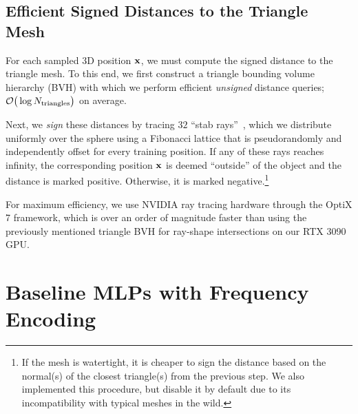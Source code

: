\documentclass[acmtog,authorversion]{acmart}
\begin{document}
\subsection{Efficient Signed Distances to the Triangle Mesh}
For each sampled 3D position $\mathbf{x}$, we must compute the signed distance to the triangle mesh.
To this end, we first construct a triangle bounding volume hierarchy (BVH) with which we perform efficient \emph{unsigned} distance queries; $\mathcal{O}\big(\log{N_\mathrm{triangles}}\big)$ on average.

Next, we \emph{sign} these distances by tracing $32$ ``stab rays''~\citep{nooruddin2003simplification}, which we distribute uniformly over the sphere using a Fibonacci lattice that is pseudorandomly and independently offset for every training position.
If any of these rays reaches infinity, the corresponding position $\mathbf{x}$ is deemed ``outside'' of the object and the distance is marked positive.
Otherwise, it is marked negative.\footnote{If the mesh is watertight, it is cheaper to sign the distance based on the normal(s) of the closest triangle(s) from the previous step. We also implemented this procedure, but disable it by default due to its incompatibility with typical meshes in the wild.}

For maximum efficiency, we use NVIDIA ray tracing hardware through the OptiX \num{7} framework, which is over an order of magnitude faster than using the previously mentioned triangle BVH for ray-shape intersections on our RTX 3090 GPU.\@


\section{Baseline MLPs with Frequency Encoding}\label{app:sdf-freq-details}
\end{document}
